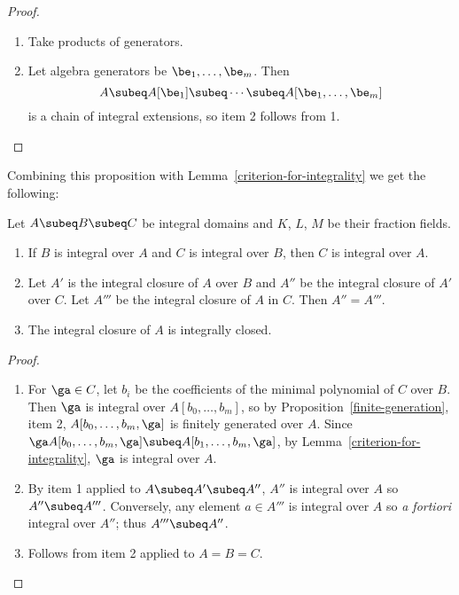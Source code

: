 \begin{proof}$\,$
\vspace{0cm}
\begin{enumerate}
\item Take products of generators.
\item 
Let algebra generators be $\be_1,\ldots, \be_m$. Then
\[A\subeq A[\be_1]\subeq \cdots \subeq A[\be_1,\ldots, \be_m]\]
is a chain of integral extensions, so item 2 follows from 1.\qedhere
\end{enumerate}
\end{proof}
Combining this proposition with Lemma~\ref{criterion-for-integrality} we get the following:
\begin{pr}
Let $A\subeq B\subeq C$ be integral domains and $K$, $L$, $M$ be their fraction fields.
\begin{enumerate}
\item If $B$ is integral over $A$ and $C$ is integral over $B$, then $C$ is integral over $A$.
\item Let $A'$ is the integral closure of $A$ over $B$ and $A''$ be the integral closure of $A'$ over $C$. Let $A'''$ be the integral closure of $A$ in $C$. %
Then $A''=A'''$.
\item The integral closure of $A$ is integrally closed.
\end{enumerate}
\end{pr}
\begin{proof}$\,$
\vspace{0cm}
\begin{enumerate}
\item For $\ga\in C$, let $b_i$ be the coefficients of the minimal polynomial of $C$ over $B$. Then $\ga$ is integral over $A[b_0,\ldots, b_m]$, so by Proposition~\ref{finite-generation}, item 2, $A[b_0,\ldots, b_m,\ga]$ is finitely generated over $A$. Since $\ga A[b_0,\ldots, b_m,\ga]\subeq A[b_1,\ldots, b_m,\ga]$, by Lemma~\ref{criterion-for-integrality}, $\ga$ is integral over $A$.
\item By item 1 applied to $A\subeq A'\subeq A''$, $A''$ is integral over $A$ so $A''\subeq A'''$. Conversely, any element $a\in A'''$ is integral over $A$ so {\it a fortiori} integral over $A''$; thus $A'''\subeq A''$.
\item Follows from item 2 applied to $A=B=C$.\qedhere
\end{enumerate}
\end{proof}

